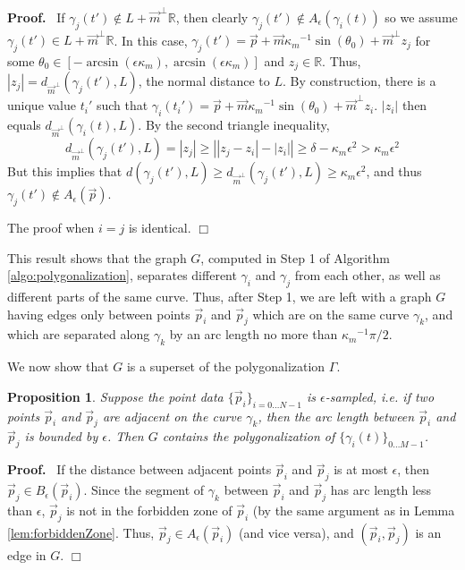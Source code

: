 \documentclass{article}
\newcommand{\nin}{\not\in}
\newtheorem{proposition}[cntr]{Proposition}
\newenvironment{proof}{
  \noindent\textbf{Proof.}\ }{\hspace*{\fill}
  \begin{math}\Box\end{math}\medskip}
\numberwithin{cntr}{section}
\numberwithin{equation}{section}
\newcommand{\abs}[1]{\left| #1 \right|}%
\newcommand{\RR}[0]{{\mathbb{R}}}
\newcommand{\vp}[0]{{\vec{p}}}
\newcommand{\vm}[0]{{\vec{m}}}
\newcommand{\Oto}[1]{{0 \ldots #1-1}}
\newcommand{\OtoN}{{0 \ldots N-1}}
\newcommand{\pointData}{{ \{ \vp_{i} \}_{i=\OtoN} }}
\newcommand{\curveSet}{{ \{ \gamma_i(t) \}_{\Oto{M}}}}
\newcommand{\ball}[2]{ { B_{#1}(#2) } }
\newcommand{\allowed}[2]{ { A_{#1}(#2) } }
\newcommand{\curvemax}{{\kappa_{m}}}
\newcommand{\curvemaxi}{{\curvemax^{-1}}}
\begin{document}
\begin{proof}
If $\gamma_{j}(t') \nin L+\vm^{\perp} \RR$,
then clearly $\gamma_{j}(t') \nin \allowed{\epsilon}{\gamma_{i}(t)}$
so we assume $\gamma_{j}(t') \in L+\vm^{\perp} \RR$. In this case,
$\gamma_{j}(t') = \vp + \vm \curvemaxi \sin(\theta_{0}) + \vm^\perp z_j$
for some $\theta_0 \in
[-\arcsin(\epsilon \curvemax),\arcsin(\epsilon \curvemax)]$
and $z_j \in \RR$.
Thus, $|z_j| = d_{\vm^{\perp}}(\gamma_{j}(t'), L)$,
the normal distance to $L$. By construction, there is a unique
value $t_i'$ such that
$\gamma_{i}(t_i') = \vp + \vm \curvemaxi \sin(\theta_{0}) + \vm^\perp z_i$.
$|z_i|$ then equals $d_{\vm^{\perp}}(\gamma_{i}(t), L)$.
By the second triangle inequality,
\begin{equation*}
  d_{\vm^{\perp}}(\gamma_{j}(t'), L)  = |z_j|
  \geq \abs{|z_j - z_i| - |z_i|}
  \geq \delta - \curvemax \epsilon^{2} > \curvemax \epsilon^{2}
\end{equation*}
But this implies that $d(\gamma_{j}(t'), L) \geq d_{\vm^{\perp}}(\gamma_{j}(t'), L) \geq \curvemax \epsilon^{2}$, and thus $\gamma_{j}(t') \nin \allowed{\epsilon}{\vp}$.

The proof when $i=j$ is identical.
\end{proof}

This result shows that the graph $G$, computed in Step 1 of Algorithm \ref{algo:polygonalization}, separates different $\gamma_{i}$ and $\gamma_{j}$ from each other, as well as different parts of the same curve. Thus, after Step 1, we are left with a graph $G$ having edges only between points $\vp_{i}$ and $\vp_{j}$ which are on the same curve $\gamma_{k}$, and which are separated along $\gamma_{k}$ by an arc length no more than $\curvemaxi \pi/2$.

We now show that $G$ is a superset of the polygonalization $\Gamma$.

\begin{proposition}
  \label{prop:polyIncludesNeighboringPoints}
  Suppose the point data $\pointData$ is $\epsilon$-sampled, i.e. if two points $\vp_{i}$ and $\vp_{j}$ are adjacent on the curve $\gamma_{k}$, then the \emph{arc length} between $\vp_{i}$ and $\vp_{j}$ is bounded by $\epsilon$. Then $G$ contains the polygonalization of $\curveSet$.
\end{proposition}
\begin{proof}
  If the distance between adjacent points $\vp_{i}$ and $\vp_{j}$ is at most $\epsilon$, then $\vp_{j} \in \ball{\epsilon}{\vp_{i}}$. Since the segment of $\gamma_{k}$ between $\vp_{i}$ and $\vp_{j}$ has arc length less than $\epsilon$, $\vp_{j}$ is not in the forbidden zone of $\vp_{i}$ (by the same argument as in Lemma \ref{lem:forbiddenZone}. Thus, $\vp_{j} \in \allowed{\epsilon}{\vp_{i}}$ (and vice versa), and $(\vp_{i},\vp_{j})$ is an edge in $G$.
\end{proof}
\end{document}

